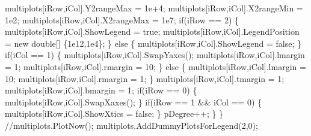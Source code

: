 {\btab multiplots[iRow,iCol].Y2rangeMax = 1e+4;\newline 
\btab multiplots[iRow,iCol].X2rangeMin = 1e2;\newline 
\btab multiplots[iRow,iCol].X2rangeMax = 1e7;\newline 
 \newline 
\btab if(iRow == 2) \{\newline 
\btab \btab multiplots[iRow,iCol].ShowLegend = true;\newline 
\btab \btab multiplots[iRow,iCol].LegendPosition = new double[] \{1e12,1e4\};\newline 
\btab \} else \{\newline 
\btab \btab multiplots[iRow,iCol].ShowLegend = false;\newline 
\btab \}\newline 
 \newline 
\btab if(iCol == 1) \{\newline 
\btab \btab multiplots[iRow,iCol].SwapYaxes();\newline 
\btab \btab multiplots[iRow,iCol].lmargin = 1;\newline 
\btab \btab multiplots[iRow,iCol].rmargin = 10;\newline 
\btab \} else \{\newline 
\btab \btab multiplots[iRow,iCol].lmargin = 10;\newline 
\btab \btab multiplots[iRow,iCol].rmargin = 1;\newline 
\btab \}\newline 
\btab multiplots[iRow,iCol].tmargin = 1;\newline 
\btab multiplots[iRow,iCol].bmargin = 1;\newline 
\btab if(iRow == 0) \{\newline 
\btab \btab multiplots[iRow,iCol].SwapXaxes();\newline 
\btab \}\newline 
\btab if(iRow == 1 && iCol == 0) \{  \newline 
\btab \btab multiplots[iRow,iCol].ShowXtics = false;\newline 
\btab \}\newline 
\btab pDegree++;\newline 
\}                        \newline 
\}\newline 
//multiplots.PlotNow();\newline 
multiplots.AddDummyPlotsForLegend(2,0);
 }
\BoSSSexe
\BoSSScmd{
 }
\BoSSSexe
\BoSSScmd{
 }
\BoSSSexe
\BoSSScmd{
 }
\BoSSSexe
{}
\BoSSSexe
{}
\BoSSSexe
{}
\BoSSSexe
{}
\BoSSSexe
